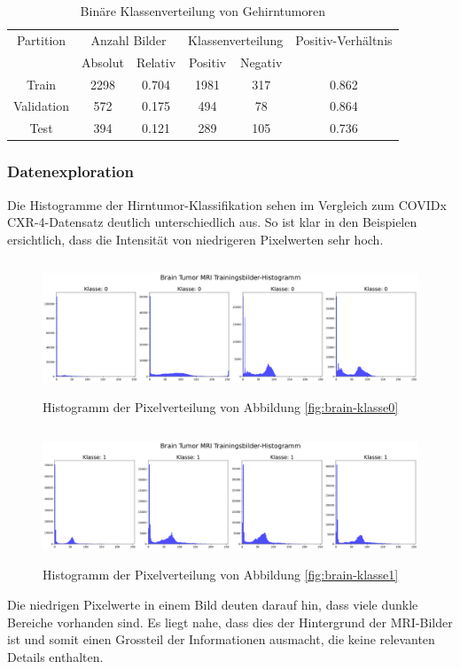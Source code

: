 \begin{table}[ht]
\centering
\begin{tabular}{@{}cccccc@{}}
\toprule
Partition & \multicolumn{2}{c}{Anzahl Bilder} & \multicolumn{2}{c}{Klassenverteilung} & Positiv-Verhältnis\\ 
\cmidrule(lr){2-3} \cmidrule(lr){4-5} 
           & Absolut & Relativ & Positiv & Negativ \\ 
\midrule
Train      & 2298 & 0.704 & 1981 & 317 & 0.862 \\
Validation & 572  & 0.175 & 494  & 78  & 0.864 \\
Test       & 394  & 0.121 & 289  & 105 & 0.736 \\ 
\bottomrule
\end{tabular}
\caption{Binäre Klassenverteilung von Gehirntumoren}
\label{tab:mri-binaere-klassenverteilung}
\end{table}

\subsubsection{Datenexploration}

Die Histogramme der Hirntumor-Klassifikation sehen im Vergleich zum COVIDx CXR-4-Datensatz deutlich unterschiedlich aus. So ist klar in den Beispielen ersichtlich, dass die Intensität von niedrigeren Pixelwerten sehr hoch.

\begin{figure}[ht]
    \centering
    \includegraphics[width=\linewidth, height=4cm]{01-images/03-data/brain-klasse0-hist.png}
    \caption{Histogramm der Pixelverteilung von Abbildung \ref{fig:brain-klasse0}}
    \label{fig:brain-klasse0-hist}
\end{figure}

\begin{figure}[ht]
    \centering
    \includegraphics[width=\linewidth, height=4cm]{01-images/03-data/brain-klasse1-hist.png}
    \caption{Histogramm der Pixelverteilung von Abbildung \ref{fig:brain-klasse1}}
    \label{fig:brain-klasse1-hist}
\end{figure}

Die niedrigen Pixelwerte in einem Bild deuten darauf hin, dass viele dunkle Bereiche vorhanden sind. Es liegt nahe, dass dies der Hintergrund der MRI-Bilder ist und somit einen Grossteil der Informationen ausmacht, die keine relevanten Details enthalten.



\newpage
